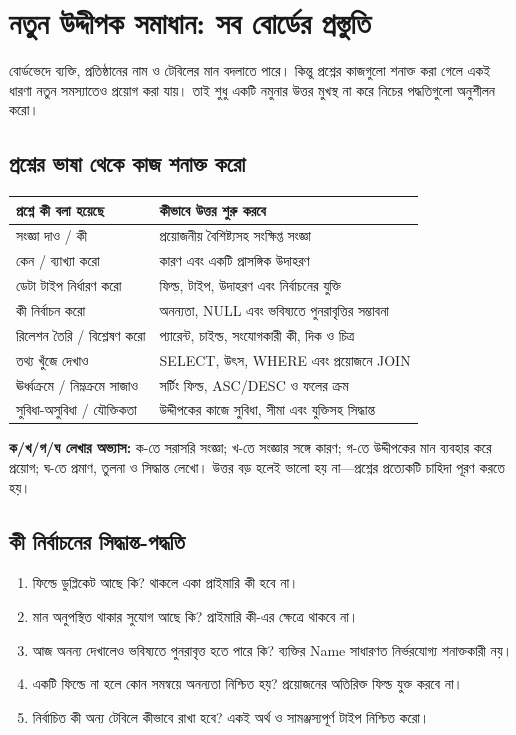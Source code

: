 \section{নতুন উদ্দীপক সমাধান: সব বোর্ডের প্রস্তুতি}

বোর্ডভেদে ব্যক্তি, প্রতিষ্ঠানের নাম ও টেবিলের মান বদলাতে পারে। কিন্তু প্রশ্নের কাজগুলো শনাক্ত করা গেলে একই ধারণা নতুন সমস্যাতেও প্রয়োগ করা যায়। তাই শুধু একটি নমুনার উত্তর মুখস্থ না করে নিচের পদ্ধতিগুলো অনুশীলন করো।

\subsection{প্রশ্নের ভাষা থেকে কাজ শনাক্ত করো}
\begin{flushleft}
\small
\begin{tabularx}{0.98\linewidth}{|p{42mm}|X|}\hline
প্রশ্নে কী বলা হয়েছে & কীভাবে উত্তর শুরু করবে\\ \hline
সংজ্ঞা দাও / কী & প্রয়োজনীয় বৈশিষ্ট্যসহ সংক্ষিপ্ত সংজ্ঞা\\ \hline
কেন / ব্যাখ্যা করো & কারণ এবং একটি প্রাসঙ্গিক উদাহরণ\\ \hline
ডেটা টাইপ নির্ধারণ করো & ফিল্ড, টাইপ, উদাহরণ এবং নির্বাচনের যুক্তি\\ \hline
কী নির্বাচন করো & অনন্যতা, NULL এবং ভবিষ্যতে পুনরাবৃত্তির সম্ভাবনা\\ \hline
রিলেশন তৈরি / বিশ্লেষণ করো & প্যারেন্ট, চাইল্ড, সংযোগকারী কী, দিক ও চিত্র\\ \hline
তথ্য খুঁজে দেখাও & SELECT, উৎস, WHERE এবং প্রয়োজনে JOIN\\ \hline
ঊর্ধ্বক্রমে / নিম্নক্রমে সাজাও & সর্টিং ফিল্ড, ASC/DESC ও ফলের ক্রম\\ \hline
সুবিধা-অসুবিধা / যৌক্তিকতা & উদ্দীপকের কাজে সুবিধা, সীমা এবং যুক্তিসহ সিদ্ধান্ত\\ \hline
\end{tabularx}
\end{flushleft}
\textbf{ক/খ/গ/ঘ লেখার অভ্যাস:} ক-তে সরাসরি সংজ্ঞা; খ-তে সংজ্ঞার সঙ্গে কারণ; গ-তে উদ্দীপকের মান ব্যবহার করে প্রয়োগ; ঘ-তে প্রমাণ, তুলনা ও সিদ্ধান্ত লেখো। উত্তর বড় হলেই ভালো হয় না---প্রশ্নের প্রত্যেকটি চাহিদা পূরণ করতে হয়।

\subsection{কী নির্বাচনের সিদ্ধান্ত-পদ্ধতি}
\begin{enumerate}
\item ফিল্ডে ডুপ্লিকেট আছে কি? থাকলে একা প্রাইমারি কী হবে না।
\item মান অনুপস্থিত থাকার সুযোগ আছে কি? প্রাইমারি কী-এর ক্ষেত্রে থাকবে না।
\item আজ অনন্য দেখালেও ভবিষ্যতে পুনরাবৃত্ত হতে পারে কি? ব্যক্তির Name সাধারণত নির্ভরযোগ্য শনাক্তকারী নয়।
\item একটি ফিল্ডে না হলে কোন সমন্বয়ে অনন্যতা নিশ্চিত হয়? প্রয়োজনের অতিরিক্ত ফিল্ড যুক্ত করবে না।
\item নির্বাচিত কী অন্য টেবিলে কীভাবে রাখা হবে? একই অর্থ ও সামঞ্জস্যপূর্ণ টাইপ নিশ্চিত করো।
\end{enumerate}

